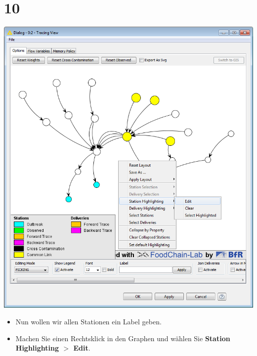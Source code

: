 \documentclass{beamer}
\begin{document}
\section{10}
\begin{frame}
	\begin{center}
  		\includegraphics[height=0.6\textheight]{10.png}
	\end{center}
	\begin{itemize}
		\item Nun wollen wir allen Stationen ein Label geben.
		\item Machen Sie einen Rechtsklick in den Graphen und wählen Sie \textbf{Station Highlighting $>$ Edit}.
	\end{itemize}
\end{frame}
\end{document}

